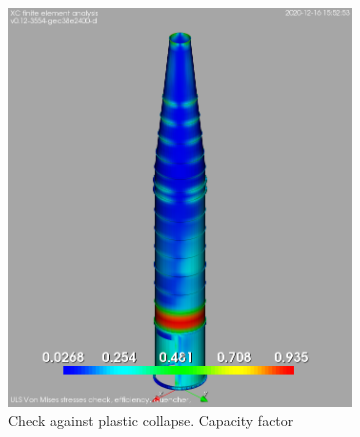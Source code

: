 \documentclass[a4paper,11pt ]{xc_webpage_project}
\begin{document}
\begin{figure}[h]
  \begin{subfigure}[b]{0.33\textwidth}
  \centering
  \includegraphics[width=\textwidth]{figures/LL01}
  \caption{Check against plastic collapse. Capacity factor}
  \end{subfigure}
\hfill
  \begin{subfigure}[b]{0.27\textwidth}
  \centering

\end{subfigure}
\end{figure}
\end{document}
